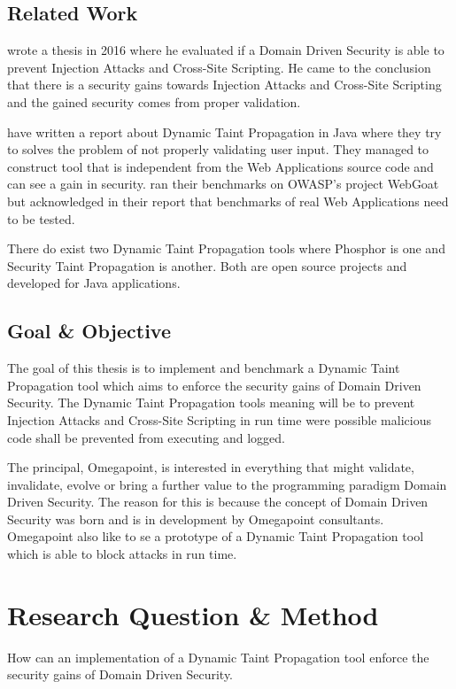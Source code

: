 \documentclass{../kththesis}
\begin{document}
\section{Related Work}
\textcite{Stendahl2016} wrote a thesis in 2016 where he evaluated if a Domain Driven Security is able to prevent Injection Attacks and Cross-Site Scripting. He came to the conclusion that there is a security gains towards Injection Attacks and Cross-Site Scripting and the gained security comes from proper validation.

\textcite{Haldar} have written a report about Dynamic Taint Propagation in Java where they try to solves the problem of not properly validating user input. They managed to construct tool that is independent from the Web Applications source code and can see a gain in security. \textcite{Haldar} ran their benchmarks on OWASP's project WebGoat \parencite{webgoat} but acknowledged in their report that benchmarks of real Web Applications need to be tested.

There do exist two Dynamic Taint Propagation tools where Phosphor \parencite{phosphor} is one and Security Taint Propagation \parencite{securityTaint} is another. Both are open source projects and developed for Java applications.


\section{Goal \& Objective}
The goal of this thesis is to implement and benchmark a Dynamic Taint Propagation tool which aims to enforce the security gains of Domain Driven Security. The Dynamic Taint Propagation tools meaning will be to prevent Injection Attacks and Cross-Site Scripting in run time were possible malicious code shall be prevented from executing and logged.

The principal, Omegapoint, is interested in everything that might validate, invalidate, evolve or bring a further value to the programming paradigm Domain Driven Security. The reason for this is because the concept of Domain Driven Security was born and is in development by Omegapoint consultants. Omegapoint also like to se a prototype of a Dynamic Taint Propagation tool which is able to block attacks in run time.



\chapter{Research Question \& Method}
\begin{chapquote}{}
	How can an implementation of a Dynamic Taint Propagation tool enforce the security gains of Domain Driven Security.
\end{chapquote}
\end{document}
